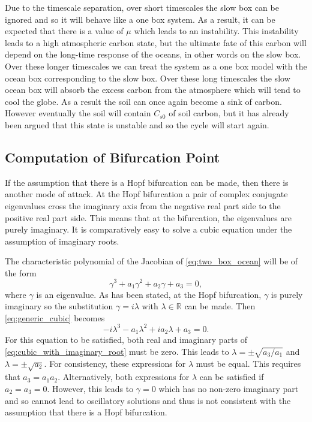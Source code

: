 Due to the timescale
separation, over short timescales the slow box can be ignored and so it will behave like a one box system. As a result, it can be expected that there
is a value of $\mu$ which leads to an instability. This instability leads to a high atmospheric carbon state, but the ultimate fate of this carbon will depend on the long-time response of the oceans, in other
words on the slow box. Over these longer timescales we can treat the system as a one box model with the ocean box corresponding to the slow box.
Over these long timescales the slow ocean box will absorb the excess carbon from the atmosphere which will tend to cool the globe. As a result
the soil can once again become a sink of carbon. However eventually the soil will contain $C_{s0}$ of soil carbon, but it has already been argued that this state is unstable
and so the cycle will start again.

\subsection{Computation of Bifurcation Point}
If the assumption that there is a Hopf bifurcation can be made, then there is another mode of attack. At the Hopf bifurcation a pair of complex conjugate eigenvalues
cross the imaginary axis from the negative real part side to the positive real part side. This means that at the bifurcation, the eigenvalues are purely imaginary. It is
comparatively easy to solve a cubic equation under the assumption of imaginary roots.

The characteristic polynomial of the Jacobian of \cref{eq:two_box_ocean} will be of the form
\begin{equation}
  \label{eq:generic_cubic}
  \gamma^3 + a_1 \gamma^2 + a_2 \gamma + a_3 = 0,
\end{equation}
where $\gamma$ is an eigenvalue. As has been stated, at the Hopf bifurcation, $\gamma$ is purely imaginary so the substitution $\gamma = i\lambda$ with $\lambda \in \mathbb{R}$
can be made. Then \cref{eq:generic_cubic} becomes
\begin{equation}
  \label{eq:cubic_with_imaginary_root}
  -i\lambda^3 - a_1 \lambda^2 + i a_2 \lambda + a_3 = 0. 
\end{equation}
For this equation to be satisfied, both real and imaginary parts of \cref{eq:cubic_with_imaginary_root} must be zero. This leads to
$\lambda = \pm \sqrt{a_3/a_1}$ and $\lambda = \pm \sqrt{a_2}$. For consistency, these expressions for $\lambda$ must be equal. This requires that $a_3 = a_1a_2$.
Alternatively, both expressions for $\lambda$ can be satisfied if $a_2 = a_3 = 0$. However, this leads to $\gamma = 0$ which has no non-zero imaginary part and so cannot lead to
oscillatory solutions and thus is not consistent with the assumption that there is a Hopf bifurcation.

